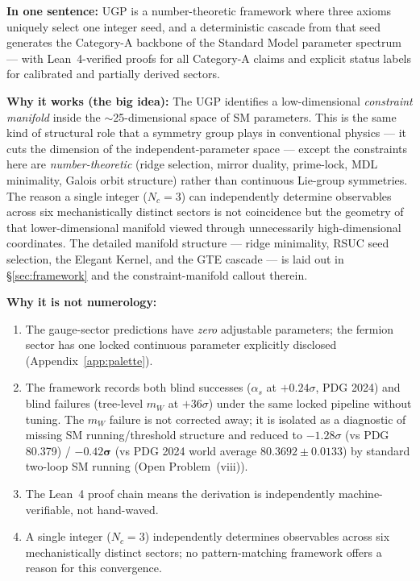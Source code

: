 \documentclass[11pt]{article}
\theoremstyle{remark}
\begin{document}
\tableofcontents
\newpage

\begin{tcolorbox}[colback=blue!3,colframe=blue!40!black,
  title={\textbf{Executive Summary}},
  fonttitle=\bfseries,left=6pt,right=6pt,top=5pt,bottom=5pt]

\textbf{In one sentence:} UGP is a number-theoretic framework where three axioms uniquely select one integer seed, and a deterministic cascade from that seed generates the Category-A backbone of the Standard Model parameter spectrum --- with Lean~4-verified proofs for all Category-A claims and explicit status labels for calibrated and partially derived sectors.

\medskip
\textbf{Why it works (the big idea):}
The UGP identifies a low-dimensional \emph{constraint manifold} inside the $\sim$25-dimensional space of SM parameters.  This is the same kind of structural role that a symmetry group plays in conventional physics --- it cuts the dimension of the independent-parameter space --- except the constraints here are \emph{number-theoretic} (ridge selection, mirror duality, prime-lock, MDL minimality, Galois orbit structure) rather than continuous Lie-group symmetries.  The reason a single integer ($N_c=3$) can independently determine observables across six mechanistically distinct sectors is not coincidence but the geometry of that lower-dimensional manifold viewed through unnecessarily high-dimensional coordinates.  The detailed manifold structure --- ridge minimality, RSUC seed selection, the Elegant Kernel, and the GTE cascade --- is laid out in \S\ref{sec:framework} and the constraint-manifold callout therein.

\medskip
\textbf{Why it is not numerology:}
\begin{enumerate}[leftmargin=1.5em,itemsep=0.1em,topsep=0.2em]
\item The gauge-sector predictions have \emph{zero} adjustable parameters; the fermion sector has one locked continuous parameter explicitly disclosed (Appendix~\ref{app:palette}).
\item The framework records both blind successes ($\alpha_s$ at $+0.24\sigma$, PDG 2024) and blind failures (tree-level $m_W$ at $+36\sigma$) under the same locked pipeline without tuning.  The $m_W$ failure is not corrected away; it is isolated as a diagnostic of missing SM running/threshold structure and reduced to $-1.28\sigma$ (vs PDG 80.379) / $\mathbf{-0.42\sigma}$ (vs PDG 2024 world average $80.3692 \pm 0.0133$) by standard two-loop SM running (Open Problem~(viii)).
\item The Lean~4 proof chain means the derivation is independently machine-verifiable, not hand-waved.
\item A single integer ($N_c = 3$) independently determines observables across six mechanistically distinct sectors; no pattern-matching framework offers a reason for this convergence.
\end{enumerate}


\end{tcolorbox}
\end{document}
